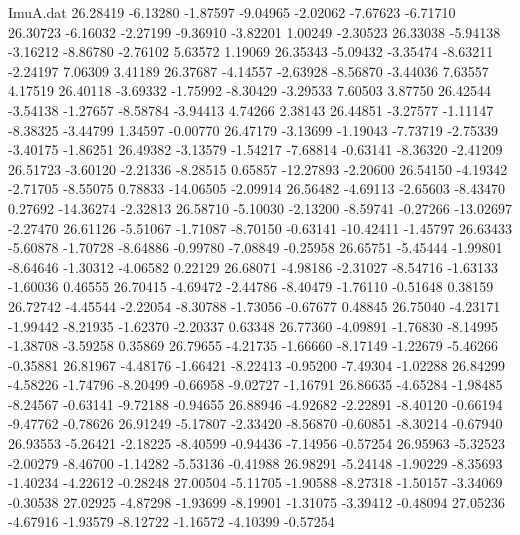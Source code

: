 \begin{filecontents}{ImuA.dat}
  26.28419   -6.13280   -1.87597   -9.04965   -2.02062   -7.67623   -6.71710
  26.30723   -6.16032   -2.27199   -9.36910   -3.82201    1.00249   -2.30523
  26.33038   -5.94138   -3.16212   -8.86780   -2.76102    5.63572    1.19069
  26.35343   -5.09432   -3.35474   -8.63211   -2.24197    7.06309    3.41189
  26.37687   -4.14557   -2.63928   -8.56870   -3.44036    7.63557    4.17519
  26.40118   -3.69332   -1.75992   -8.30429   -3.29533    7.60503    3.87750
  26.42544   -3.54138   -1.27657   -8.58784   -3.94413    4.74266    2.38143
  26.44851   -3.27577   -1.11147   -8.38325   -3.44799    1.34597   -0.00770
  26.47179   -3.13699   -1.19043   -7.73719   -2.75339   -3.40175   -1.86251
  26.49382   -3.13579   -1.54217   -7.68814   -0.63141   -8.36320   -2.41209
  26.51723   -3.60120   -2.21336   -8.28515    0.65857  -12.27893   -2.20600
  26.54150   -4.19342   -2.71705   -8.55075    0.78833  -14.06505   -2.09914
  26.56482   -4.69113   -2.65603   -8.43470    0.27692  -14.36274   -2.32813
  26.58710   -5.10030   -2.13200   -8.59741   -0.27266  -13.02697   -2.27470
  26.61126   -5.51067   -1.71087   -8.70150   -0.63141  -10.42411   -1.45797
  26.63433   -5.60878   -1.70728   -8.64886   -0.99780   -7.08849   -0.25958
  26.65751   -5.45444   -1.99801   -8.64646   -1.30312   -4.06582    0.22129
  26.68071   -4.98186   -2.31027   -8.54716   -1.63133   -1.60036    0.46555
  26.70415   -4.69472   -2.44786   -8.40479   -1.76110   -0.51648    0.38159
  26.72742   -4.45544   -2.22054   -8.30788   -1.73056   -0.67677    0.48845
  26.75040   -4.23171   -1.99442   -8.21935   -1.62370   -2.20337    0.63348
  26.77360   -4.09891   -1.76830   -8.14995   -1.38708   -3.59258    0.35869
  26.79655   -4.21735   -1.66660   -8.17149   -1.22679   -5.46266   -0.35881
  26.81967   -4.48176   -1.66421   -8.22413   -0.95200   -7.49304   -1.02288
  26.84299   -4.58226   -1.74796   -8.20499   -0.66958   -9.02727   -1.16791
  26.86635   -4.65284   -1.98485   -8.24567   -0.63141   -9.72188   -0.94655
  26.88946   -4.92682   -2.22891   -8.40120   -0.66194   -9.47762   -0.78626
  26.91249   -5.17807   -2.33420   -8.56870   -0.60851   -8.30214   -0.67940
  26.93553   -5.26421   -2.18225   -8.40599   -0.94436   -7.14956   -0.57254
  26.95963   -5.32523   -2.00279   -8.46700   -1.14282   -5.53136   -0.41988
  26.98291   -5.24148   -1.90229   -8.35693   -1.40234   -4.22612   -0.28248
  27.00504   -5.11705   -1.90588   -8.27318   -1.50157   -3.34069   -0.30538
  27.02925   -4.87298   -1.93699   -8.19901   -1.31075   -3.39412   -0.48094
  27.05236   -4.67916   -1.93579   -8.12722   -1.16572   -4.10399   -0.57254

\end{filecontents}
